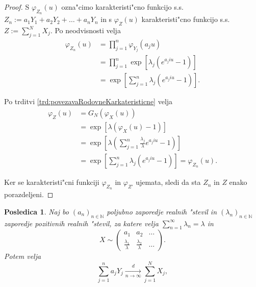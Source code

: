 \documentclass[12pt, a4paper, reqno]{amsart}
\theoremstyle{definition} %
\theoremstyle{plain} %
\newtheorem{posledica}[definicija]{Posledica}
\newcommand{\N}{\mathbb{N}}
\newcommand{\1}{\mathds{1}}
\begin{document}
    \begin{proof}
        S $\varphi_{Z_n}(u)$ ozna"cimo karakteristi"cno funkcijo s.s.\ 
        $Z_n := a_1Y_1 + a_2Y_2 + \dots + a_nY_n$ in s $\varphi_{Z}(u)$ karakteristi"cno funkcijo s.s.\
        $Z:= \sum_{j=1}^{N}X_j$. Po neodvisnosti velja
        \begin{align*}
            \varphi_{Z_n}(u) 
                    &= \prod_{j=1}^{n}\varphi_{Y_j}(a_ju)\\
                    &= \prod_{j=1}^{n}\exp\left[\lambda_j\left(e^{a_j i u} - 1\right)\right] \\
                    &= \exp\left[\sum_{j=1}^{n}\lambda_j\left(e^{a_j i u} - 1\right)\right].
        \end{align*}

        \noindent
        Po trditvi \ref{trd:povezavaRodovneKarkateristicne} velja
        \begin{align*}
            \varphi_{Z}(u) 
                    &= G_N\left(\varphi_X(u)\right) \\
                    &= \exp\left[\lambda\left(\varphi_X(u) - 1\right)\right] \\
                    & = \exp\left[\lambda\left(\sum_{j=1}^n\frac{\lambda_j}{\lambda}e^{a_jiu} - 1\right)\right]\\
                    &= \exp\left[\sum_{j=1}^{n}\lambda_j\left(e^{a_j i u} - 1\right)\right] = \varphi_{Z_n}(u).
        \end{align*}

        \noindent 
        Ker se karakteristi"cni funkciji $\varphi_{Z_n}$ in $\varphi_{Z'}$ ujemata, sledi da sta 
        $Z_n$ in $Z$ enako porazdeljeni. %
    \end{proof}

    \begin{posledica}
        Naj bo $(a_n)_{n\in\N}$ poljubno zaporedje realnih "stevil in $(\lambda_n)_{n\in\N}$ zaporedje 
        pozitivnih realnih "stevil, za katere velja $\sum_{n=1}^\infty\lambda_n = \lambda$ in 
        \begin{equation*}
            X\sim
            \begin{pmatrix}
                a_1 & a_2 &  \dots \\
                \tfrac{\lambda_1}{\lambda} & \tfrac{\lambda_2}{\lambda} & \dots
            \end{pmatrix}.
        \end{equation*}
        Potem velja
        \begin{equation*}
            \sum_{j=1}^{n}a_jY_j \xrightarrow[n\to\infty]{d}\sum_{j=1}^NX_j,
        \end{equation*}
        \label{pos:NXjeEnakoaYstevno}
    \end{posledica}
\end{document}
